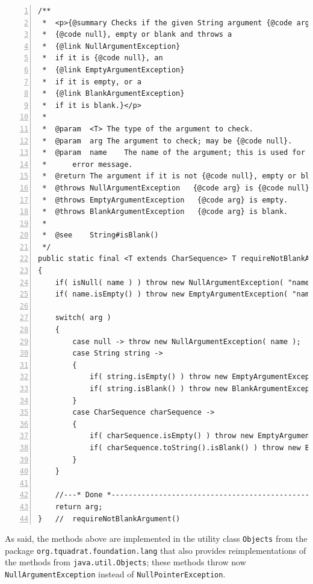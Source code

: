\documentclass[11pt,a4paper, titlepage, parskip=half, headsepline, footsepline, cleardoublepage=current, headheight=1cm]{scrbook}
\begin{document}
\begin{lstlisting}[numbers=left,caption={requireNotBlankArgument()},label={listing:requireNotBlankArgument}]
/**
 *  <p>{@summary Checks if the given String argument {@code arg} is
 *  {@code null}, empty or blank and throws a
 *  {@link NullArgumentException}
 *  if it is {@code null}, an
 *  {@link EmptyArgumentException}
 *  if it is empty, or a
 *  {@link BlankArgumentException}
 *  if it is blank.}</p>
 *
 *  @param  <T> The type of the argument to check.
 *  @param  arg The argument to check; may be {@code null}.
 *  @param  name    The name of the argument; this is used for the
 *      error message.
 *  @return The argument if it is not {@code null}, empty or blank.
 *  @throws NullArgumentException   {@code arg} is {@code null}.
 *  @throws EmptyArgumentException   {@code arg} is empty.
 *  @throws BlankArgumentException   {@code arg} is blank.
 *
 *  @see    String#isBlank()
 */
public static final <T extends CharSequence> T requireNotBlankArgument( final T arg, final String name )
{
    if( isNull( name ) ) throw new NullArgumentException( "name" );
    if( name.isEmpty() ) throw new EmptyArgumentException( "name" );

    switch( arg )
    {
        case null -> throw new NullArgumentException( name );
        case String string ->
        {
            if( string.isEmpty() ) throw new EmptyArgumentException( name );
            if( string.isBlank() ) throw new BlankArgumentException( name );
        }
        case CharSequence charSequence ->
        {
            if( charSequence.isEmpty() ) throw new EmptyArgumentException( name );
            if( charSequence.toString().isBlank() ) throw new BlankArgumentException( name );
        }
    }

    //---* Done *----------------------------------------------------------
    return arg;
}   //  requireNotBlankArgument()
\end{lstlisting}

As said, the methods above are implemented in the utility class \lstinline|Objects|\autocite{TQUADRAT_ORG_FOUNDATION_OBJECTS} from the package \lstinline|org.tquadrat.foundation.lang| that also provides reimplementations of the methods from \lstinline|java.util.Objects|; these methods throw now \lstinline|NullArgumentException| instead of \lstinline|NullPointerException|.
\end{document}

